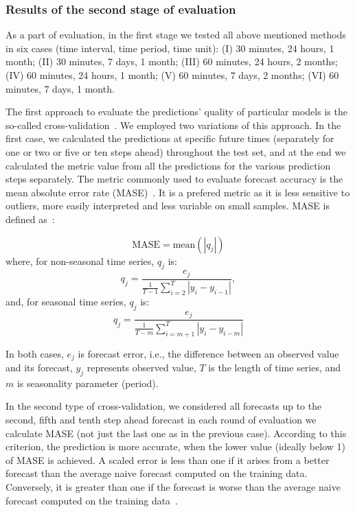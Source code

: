 \documentclass[runningheads]{llncs}
\begin{document}
\subsubsection{Results of the second stage of  evaluation}

As a part of evaluation, in the first stage we tested all above mentioned methods in six cases (time interval, time period, time unit): (I) 30 minutes, 24 hours, 1 month; (II) 30 minutes, 7 days, 1 month; (III) 60 minutes, 24 hours, 2 months; (IV) 60 minutes, 24 hours, 1 month; (V) 60 minutes, 7 days, 2 months; (VI) 60 minutes, 7 days, 1 month.



The first approach to evaluate the predictions’ quality of particular models is the so-called cross-validation~\cite{hyndman2018forecasting}. We employed two variations of this approach. In the first case, we calculated the predictions at specific future times (separately for one or two or five or ten steps ahead) throughout the test set, and at the end we calculated the metric value from all the predictions for the various prediction steps separately. The metric commonly used to evaluate forecast accuracy is the mean absolute error rate (MASE)~\cite{hyndman2006another}. 
It is a prefered metric as it is less sensitive to outliers, more easily interpreted and less variable on small samples. 
MASE is defined as~\cite{hyndman2018forecasting}:

% 
\begin{equation}
\textrm{MASE} = \textrm{mean}(|q_j|)
\end{equation}
% 
where, for non-seasonal time series, $q_j$ is:
% 
\begin{equation} 
q_j= \frac{e_j}{\frac{1}{T-1} \sum_{i=2}^{T}|y_i - y_{i-1}|},
\end{equation}
% 
and, for seasonal time series, $q_j$ is:
% 
\begin{equation} 
q_j = \frac{e_j}{\frac{1}{T-m} \sum_{i=m+1}^{T}|y_i - y_{i-m}|}
\end{equation}

In both cases, $e_j$ is forecast error, i.e., the difference between an observed value and its forecast, $y_j$ represents observed value, $T$ is the length of time series, and $m$ is seasonality parameter (period).

In the second type of cross-validation, we considered all forecasts  up to the second, fifth and tenth step ahead forecast in each round of evaluation we calculate MASE (not just the last one as in the previous case). According to this criterion, the prediction is more accurate, when the lower value (ideally below 1) of MASE is achieved. A scaled error is less than one if it arises from a better forecast than the average naive forecast computed on the training data. Conversely, it is greater than one if the forecast is worse than the average naive forecast computed on the training data~\cite{hyndman2014measuring}.
\end{document}

